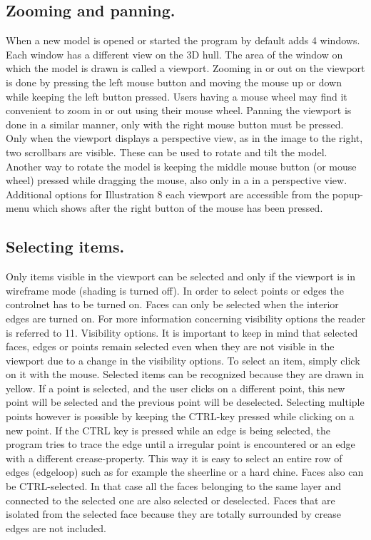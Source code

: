 \documentclass[12pt]{article}
\begin{document}
\subsection{Zooming and panning.}
When a new model is opened or started the program by default adds 4 windows. Each window has
a different view on the 3D hull. The area of the window on which the model is drawn is called a
viewport. Zooming in or out on the viewport is done by
pressing the left mouse button and moving the mouse
up or down while keeping the left button pressed.
Users having a mouse wheel may find it convenient to
zoom in or out using their mouse wheel. Panning the
viewport is done in a similar manner, only with the right
mouse button must be pressed. Only when the
viewport displays a perspective view, as in the image
to the right, two scrollbars are visible. These can be
used to rotate and tilt the model. Another way to rotate
the model is keeping the middle mouse button (or
mouse wheel) pressed while dragging the mouse, also
only in a in a perspective view. Additional options for
 Illustration 8
each viewport are accessible from the popup-menu which shows after the right button of the mouse
has been pressed.

\subsection{Selecting items.}
Only items visible in the viewport can be selected and only if the viewport is in wireframe mode
(shading is turned off). In order to select points or edges the controlnet has to be turned on. Faces
can only be selected when the interior edges are turned on. For more information concerning
visibility options the reader is referred to 11. Visibility options. It is important to keep in mind that
selected faces, edges or points remain selected even when they are not visible in the viewport due
to a change in the visibility options. To select an item, simply click on it with the mouse. Selected
items can be recognized because they are drawn in yellow. If a point is selected, and the user clicks
on a different point, this new point will be selected and the previous point will be deselected.
Selecting multiple points however is possible by keeping the CTRL-key pressed while clicking on a
new point.
If the CTRL key is pressed while an edge is being selected, the program tries to trace the edge until
a irregular point is encountered or an edge with a different crease-property. This way it is easy to
select an entire row of edges (edgeloop) such as for example the sheerline or a hard chine.
Faces also can be CTRL-selected. In that case all the faces belonging to the same layer and
connected to the selected one are also selected or deselected. Faces that are isolated from the
selected face because they are totally surrounded by crease edges are not included.
\end{document}
